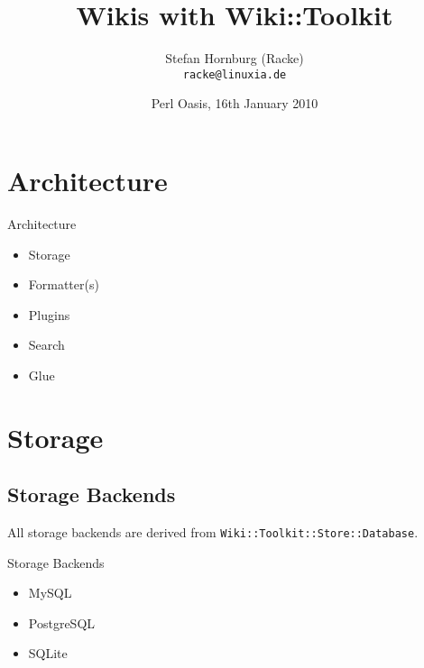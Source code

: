 
\usepackage{beamerthemesplit}
\usepackage{verbatim}
\usepackage{hyperref}
\usepackage{listings}
\lstset{language=Perl}

\title{Wikis with Wiki::Toolkit}
\author[racke]{Stefan Hornburg (Racke)\\ \texttt{racke@linuxia.de}}
\date[OPW2010]{Perl Oasis, 16th January 2010}



\begin{frame}
  \titlepage
\end{frame}

\tableofcontents

\section{Architecture}


\begin{frame}{Architecture}
 \begin{itemize}
  \item<1-> Storage
  \item<2-> Formatter(s)
  \item<3-> Plugins
  \item<4-> Search
  \item<5-> Glue
 \end{itemize}
\end{frame}


\section{Storage}

\subsection{Storage Backends}

All storage backends are derived from \verb+Wiki::Toolkit::Store::Database+.

\begin{frame}{Storage Backends}
 \begin{itemize}
  \item MySQL
  \item PostgreSQL
  \item SQLite
 \end{itemize}
\end{frame}

